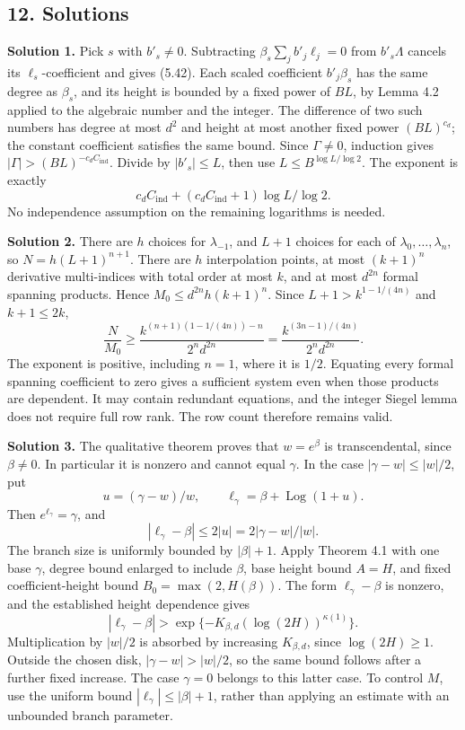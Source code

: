 \documentclass[
  11pt,
  a4paper,
]{article}
\begin{document}
\subsection{12. Solutions}\label{solutions}

\textbf{Solution 1.} Pick \(s\) with \(b'_s\ne0\). Subtracting
\(\beta_s\sum_jb'_j\ell_j=0\) from \(b'_s\Lambda\) cancels its
\(\ell_s\)-coefficient and gives (5.42). Each scaled coefficient
\(b'_j\beta_s\) has the same degree as \(\beta_s\), and its height is
bounded by a fixed power of \(BL\), by Lemma 4.2 applied to the
algebraic number and the integer. The difference of two such numbers has
degree at most \(d^2\) and height at most another fixed power
\((BL)^{c_d}\); the constant coefficient satisfies the same bound. Since
\(\Gamma\ne0\), induction gives
\(|\Gamma|>(BL)^{-c_dC_{\mathrm{ind}}}\). Divide by \(|b'_s|\le L\),
then use \(L\le B^{\log L/\log2}\). The exponent is exactly \[
c_dC_{\mathrm{ind}}+(c_dC_{\mathrm{ind}}+1)\log L/\log2.
\] No independence assumption on the remaining logarithms is needed.

\textbf{Solution 2.} There are \(h\) choices for \(\lambda_{-1}\), and
\(L+1\) choices for each of \(\lambda_0,\ldots,\lambda_n\), so
\(N=h(L+1)^{n+1}\). There are \(h\) interpolation points, at most
\((k+1)^n\) derivative multi-indices with total order at most \(k\), and
at most \(d^{2n}\) formal spanning products. Hence
\(M_0\le d^{2n}h(k+1)^n\). Since \(L+1>k^{1-1/(4n)}\) and \(k+1\le2k\),
\[
\frac N{M_0}\ge\frac{k^{(n+1)(1-1/(4n))-n}}{2^nd^{2n}}
=\frac{k^{(3n-1)/(4n)}}{2^nd^{2n}}.
\] The exponent is positive, including \(n=1\), where it is \(1/2\).
Equating every formal spanning coefficient to zero gives a sufficient
system even when those products are dependent. It may contain redundant
equations, and the integer Siegel lemma does not require full row rank.
The row count therefore remains valid.

\textbf{Solution 3.} The qualitative theorem proves that \(w=e^\beta\)
is transcendental, since \(\beta\ne0\). In particular it is nonzero and
cannot equal \(\gamma\). In the case \(|\gamma-w|\le|w|/2\), put \[
u=(\gamma-w)/w,\qquad \ell_\gamma=\beta+\operatorname{Log}(1+u).
\] Then \(e^{\ell_\gamma}=\gamma\), and \[
|\ell_\gamma-\beta|\le2|u|
=2|\gamma-w|/|w|.
\] The branch size is uniformly bounded by \(|\beta|+1\). Apply Theorem
4.1 with one base \(\gamma\), degree bound enlarged to include
\(\beta\), base height bound \(A=H\), and fixed coefficient-height bound
\(B_0=\max(2,H(\beta))\). The form \(\ell_\gamma-\beta\) is nonzero, and
the established height dependence gives \[
|\ell_\gamma-\beta|>\exp\{-K_{\beta,d}(\log(2H))^{\kappa(1)}\}.
\] Multiplication by \(|w|/2\) is absorbed by increasing
\(K_{\beta,d}\), since \(\log(2H)\ge1\). Outside the chosen disk,
\(|\gamma-w|>|w|/2\), so the same bound follows after a further fixed
increase. The case \(\gamma=0\) belongs to this latter case. To control
\(M\), use the uniform bound \(|\ell_\gamma|\le|\beta|+1\), rather than
applying an estimate with an unbounded branch parameter.
\end{document}
